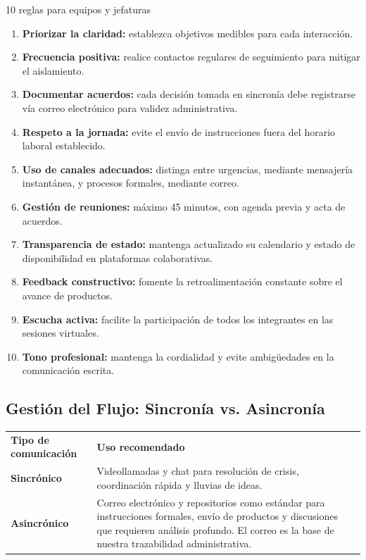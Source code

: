 \documentclass[11pt,letterpaper]{article}
\newcommand{\strong}[1]{\textbf{\textcolor{AzulProfundo}{#1}}}
\begin{document}
\begin{KeyBox}{10 reglas para equipos y jefaturas}
\begin{enumerate}
    \item \strong{Priorizar la claridad:} establezca objetivos medibles para cada interacción.
    \item \strong{Frecuencia positiva:} realice contactos regulares de seguimiento para mitigar el aislamiento.
    \item \strong{Documentar acuerdos:} cada decisión tomada en sincronía debe registrarse vía correo electrónico para validez administrativa.
    \item \strong{Respeto a la jornada:} evite el envío de instrucciones fuera del horario laboral establecido.
    \item \strong{Uso de canales adecuados:} distinga entre urgencias, mediante mensajería instantánea, y procesos formales, mediante correo.
    \item \strong{Gestión de reuniones:} máximo 45 minutos, con agenda previa y acta de acuerdos.
    \item \strong{Transparencia de estado:} mantenga actualizado su calendario y estado de disponibilidad en plataformas colaborativas.
    \item \strong{Feedback constructivo:} fomente la retroalimentación constante sobre el avance de productos.
    \item \strong{Escucha activa:} facilite la participación de todos los integrantes en las sesiones virtuales.
    \item \strong{Tono profesional:} mantenga la cordialidad y evite ambigüedades en la comunicación escrita.
\end{enumerate}
\end{KeyBox}

\subsection{Gestión del Flujo: Sincronía vs. Asincronía}

\begin{tabularx}{\textwidth}{L{0.28\textwidth} Y}
\color{BlancoIndustrial}\textbf{Tipo de comunicación} & \color{BlancoIndustrial}\textbf{Uso recomendado} \\
\textbf{Sincrónico} & Videollamadas y chat para resolución de crisis, coordinación rápida y lluvias de ideas. \\
\textbf{Asincrónico} & Correo electrónico y repositorios como estándar para instrucciones formales, envío de productos y discusiones que requieren análisis profundo. El correo es la base de nuestra trazabilidad administrativa. \\
\end{tabularx}
\end{document}
